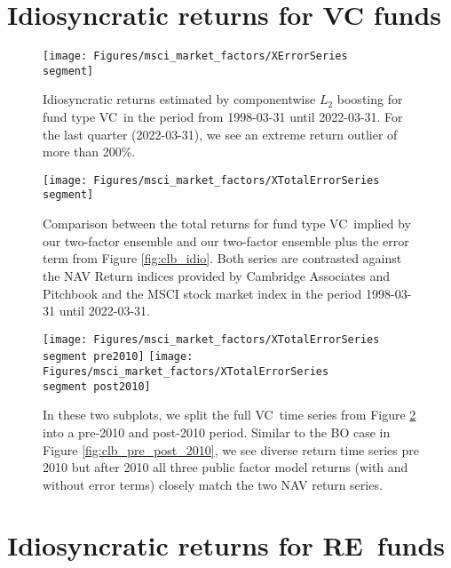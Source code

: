 \clearpage


\newcommand{\segment}{BO}

\section{Idiosyncratic returns for VC funds}
\label{sec:vc_errors}


\renewcommand{\segment}{VC}

\begin{figure}[H]
	\centering
	\texttt{[image: Figures/msci\_market\_factors/XErrorSeries\\segment]}
	\caption{
		Idiosyncratic returns estimated by componentwise $L_2$ boosting for fund type \segment \ in the period from 1998-03-31 until 2022-03-31.
		For the last quarter (2022-03-31), we see an extreme return outlier of more than 200\%.
	}
	\label{fig:clb_idio_\segment}
\end{figure}

\begin{figure}[H]
	\centering
	\texttt{[image: Figures/msci\_market\_factors/XTotalErrorSeries\\segment]}
	\caption{
		Comparison between the total returns for fund type \segment \ implied by our two-factor ensemble and our two-factor ensemble plus the error term from Figure \ref{fig:clb_idio}.
		Both series are contrasted against the NAV Return indices provided by Cambridge Associates and Pitchbook and the MSCI stock market index in the period 1998-03-31 until 2022-03-31.
	}
	\label{fig:clb_total_\segment}
\end{figure}

\begin{figure}[H]
	\centering
	\texttt{[image: Figures/msci\_market\_factors/XTotalErrorSeries\\segment pre2010]}
	\texttt{[image: Figures/msci\_market\_factors/XTotalErrorSeries\\segment post2010]}
	\caption{
		In these two subplots, we split the full \segment \ time series from Figure \ref{fig:clb_total_\segment} into a pre-2010 and post-2010 period.
		Similar to the BO case in Figure \ref{fig:clb_pre_post_2010}, we see diverse return time series pre 2010 but after 2010 all three public factor model returns (with and without error terms) closely match the two NAV return series.
	}
	\label{fig:clb_pre_post_2010_\segment}
\end{figure}


\renewcommand{\segment}{RE}

\section{Idiosyncratic returns for \segment \ funds}
\label{sec:errors_\segment}

